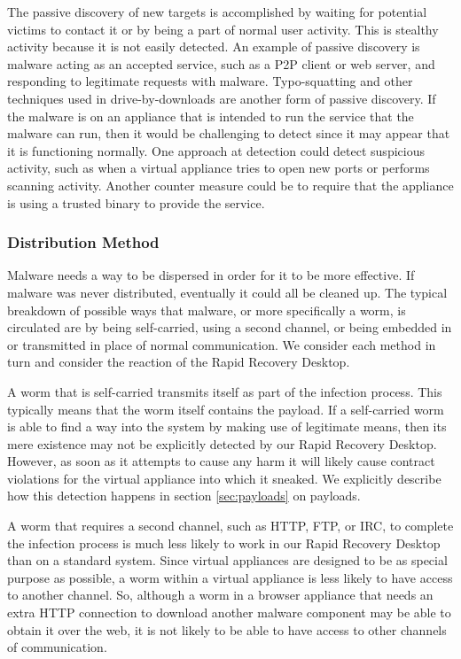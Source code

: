 The passive discovery of new targets is accomplished by waiting for potential victims to contact it or by being a part of normal user activity. This is stealthy activity because it is not easily detected. An example of passive discovery is malware acting as an accepted service, such as a P2P client or web server, and responding to legitimate requests with malware. Typo-squatting and other techniques used in drive-by-downloads are another form of passive discovery. If the malware is on an appliance that is intended to run the service that the malware can run, then it would be challenging to detect since it may appear that it is functioning normally. One approach at detection could detect suspicious activity, such as when a virtual appliance tries to open new ports or performs scanning activity. Another counter measure could be to require that the appliance is using a trusted binary to provide the service.

\subsubsection{Distribution Method}

Malware needs a way to be dispersed in order for it to be more effective. If malware was never distributed, eventually it could all be cleaned up. The typical breakdown of possible ways that malware, or more specifically a worm, is circulated are by being self-carried, using a second channel, or being embedded in or transmitted in place of normal communication. We consider each method in turn and consider the reaction of the Rapid Recovery Desktop.

A worm that is self-carried transmits itself as part of the infection process. This typically means that the worm itself contains the payload. If a self-carried worm is able to find a way into the system by making use of legitimate means, then its mere existence may not be explicitly detected by our Rapid Recovery Desktop. However, as soon as it attempts to cause any harm it will likely cause contract violations for the virtual appliance into which it sneaked. We explicitly describe how this detection happens in section \ref{sec:payloads} on payloads.

A worm that requires a second channel, such as HTTP, FTP, or IRC, to complete the infection process is much less likely to work in our Rapid Recovery Desktop than on a standard system. Since virtual appliances are designed to be as special purpose as possible, a worm within a virtual appliance is less likely to have access to another channel. So, although a worm in a browser appliance that needs an extra HTTP connection to download another malware component may be able to obtain it over the web, it is not likely to be able to have access to other channels of communication.

